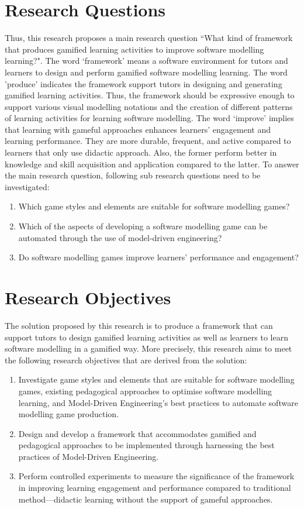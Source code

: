 \documentclass[12pt, a4paper]{report} \usepackage[titletoc]{appendix}
\begin{document}
\section{Research Questions}
Thus, this research proposes a main research question ``What kind of framework that produces gamified learning activities to improve software modelling learning?". The word `framework' means a software environment for tutors and learners to design and perform gamified software modelling learning. The word 'produce' indicates the framework support tutors in designing and generating gamified learning activities. Thus, the framework should be expressive enough to support various visual modelling notations and the creation of different patterns of learning activities for learning software modelling. The word `improve' implies that learning with gameful approaches enhances learners' engagement and learning performance. They are more durable, frequent, and active compared to learners that only use didactic approach. Also, the former perform better in knowledge and skill acquisition and application compared to the latter. To answer the main research question, following sub research questions need to be investigated:
\begin{enumerate} 
\item Which game styles and elements are suitable for software modelling games?
\item Which of the aspects of developing a software modelling game can be automated through the use of model-driven engineering?
\item Do software modelling games improve learners' performance and engagement?
\end{enumerate}

\section{Research Objectives}
The solution proposed by this research is to produce a framework that can support tutors to design gamified learning activities as well as learners to learn software modelling in a gamified way. More precisely, this research aims to meet the following research objectives that are derived from the solution:
\begin{enumerate}
\item Investigate game styles and elements that are suitable for software modelling games, existing pedagogical approaches to optimise software modelling learning, and Model-Driven Engineering's best practices to automate software modelling game production.
\item Design and develop a framework that accommodates gamified and pedagogical approaches to be implemented through harnessing the best practices of Model-Driven Engineering. 
\item Perform controlled experiments to measure the significance of the framework in improving learning engagement and performance compared to traditional method---didactic learning without the support of gameful approaches.
\end{enumerate}
\end{document}
